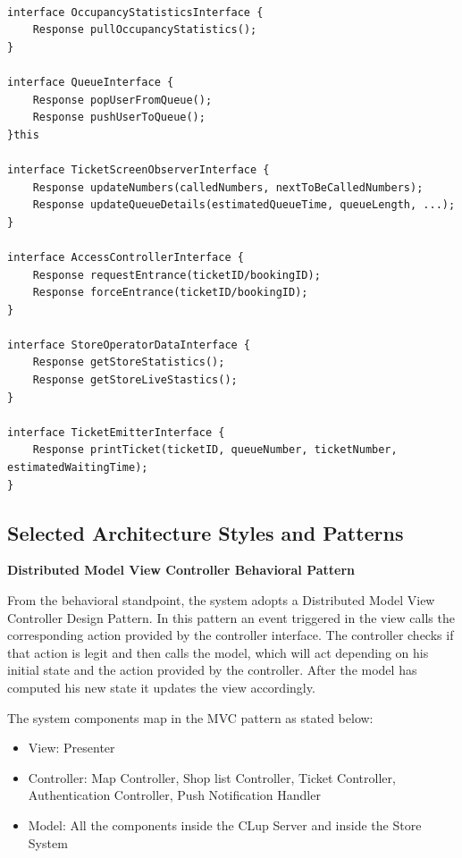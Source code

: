 \begin{lstlisting}

interface OccupancyStatisticsInterface {
    Response pullOccupancyStatistics();
}

interface QueueInterface {
    Response popUserFromQueue();
    Response pushUserToQueue();
}this

interface TicketScreenObserverInterface {
    Response updateNumbers(calledNumbers, nextToBeCalledNumbers);
    Response updateQueueDetails(estimatedQueueTime, queueLength, ...);
}

interface AccessControllerInterface {
    Response requestEntrance(ticketID/bookingID);
    Response forceEntrance(ticketID/bookingID);
}

interface StoreOperatorDataInterface {
    Response getStoreStatistics();
    Response getStoreLiveStastics();
}

interface TicketEmitterInterface {
    Response printTicket(ticketID, queueNumber, ticketNumber, estimatedWaitingTime);
}

\end{lstlisting}



\clearpage
\subsection{Selected Architecture Styles and Patterns}
\textbf{Distributed Model View Controller Behavioral Pattern}

\medskip

From the behavioral standpoint, the system adopts a Distributed Model View Controller Design Pattern. In this pattern an event triggered in the view calls the corresponding action provided by the controller interface. The controller checks if that action is legit and then calls the model, which will act depending on his initial state and the action provided by the controller.
After the model has computed his new state it updates the view accordingly.

The system components map in the MVC pattern as stated below:
\begin{itemize}
    \item View: Presenter
    \item Controller: Map Controller, Shop list Controller, Ticket Controller, Authentication Controller, Push Notification Handler
    \item Model: All the components inside the CLup Server and inside the Store System
\end{itemize}

